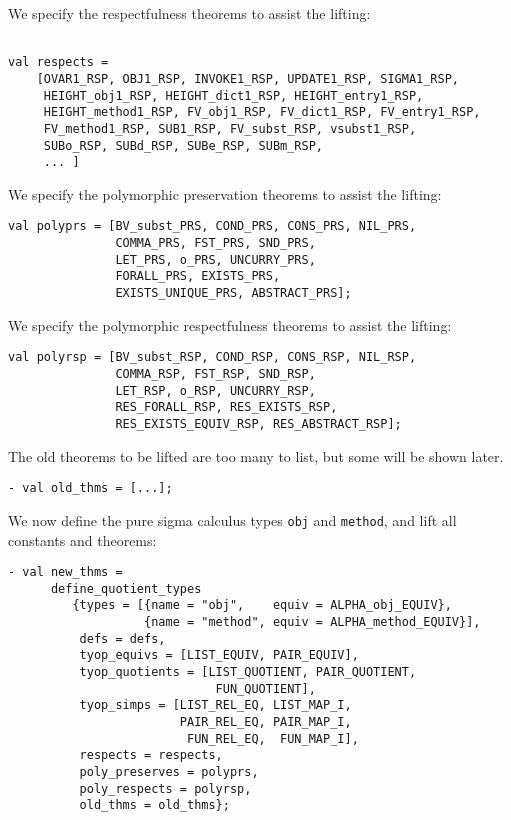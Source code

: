 \documentclass[envcountsame,runningheads]{llncs}
\begin{document}
We specify the respectfulness theorems to assist the lifting:
\begin{verbatim}

val respects =
    [OVAR1_RSP, OBJ1_RSP, INVOKE1_RSP, UPDATE1_RSP, SIGMA1_RSP,
     HEIGHT_obj1_RSP, HEIGHT_dict1_RSP, HEIGHT_entry1_RSP,
     HEIGHT_method1_RSP, FV_obj1_RSP, FV_dict1_RSP, FV_entry1_RSP,
     FV_method1_RSP, SUB1_RSP, FV_subst_RSP, vsubst1_RSP,
     SUBo_RSP, SUBd_RSP, SUBe_RSP, SUBm_RSP,
     ... ]
\end{verbatim}

We specify the polymorphic
preservation
theorems to assist the lifting:
\begin{verbatim}
val polyprs = [BV_subst_PRS, COND_PRS, CONS_PRS, NIL_PRS,
               COMMA_PRS, FST_PRS, SND_PRS,
               LET_PRS, o_PRS, UNCURRY_PRS,
               FORALL_PRS, EXISTS_PRS,
               EXISTS_UNIQUE_PRS, ABSTRACT_PRS];
\end{verbatim}

We specify the polymorphic respectfulness theorems
to assist the lifting:
\begin{verbatim}
val polyrsp = [BV_subst_RSP, COND_RSP, CONS_RSP, NIL_RSP,
               COMMA_RSP, FST_RSP, SND_RSP,
               LET_RSP, o_RSP, UNCURRY_RSP,
               RES_FORALL_RSP, RES_EXISTS_RSP,
               RES_EXISTS_EQUIV_RSP, RES_ABSTRACT_RSP];
\end{verbatim}

The old theorems to be lifted are too many to list, but some will
be shown later.
\begin{verbatim}
- val old_thms = [...];
\end{verbatim}

We now define the pure sigma calculus types {\tt obj} and {\tt method},
and lift all constants and theorems:

\begin{verbatim}
- val new_thms =
      define_quotient_types
         {types = [{name = "obj",    equiv = ALPHA_obj_EQUIV},
                   {name = "method", equiv = ALPHA_method_EQUIV}],
          defs = defs,
          tyop_equivs = [LIST_EQUIV, PAIR_EQUIV],
          tyop_quotients = [LIST_QUOTIENT, PAIR_QUOTIENT,
                             FUN_QUOTIENT],
          tyop_simps = [LIST_REL_EQ, LIST_MAP_I,
                        PAIR_REL_EQ, PAIR_MAP_I,
                         FUN_REL_EQ,  FUN_MAP_I],
          respects = respects,
          poly_preserves = polyprs,
          poly_respects = polyrsp,
          old_thms = old_thms};
\end{verbatim}
\end{document}

